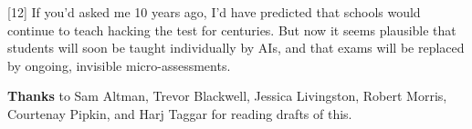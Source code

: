 [12] If you'd asked me 10 years ago, I'd have predicted that
                  schools would continue to teach hacking the test for
                  centuries. But now it seems plausible that students will soon
                  be taught individually by AIs, and that exams will be replaced
                  by ongoing, invisible micro-assessments.



\textbf{Thanks} to Sam Altman, Trevor Blackwell, Jessica
                    Livingston, Robert Morris, Courtenay Pipkin, and Harj Taggar
                    for reading drafts of this.


              
            
          
            
              
                


                  
              
            
          
